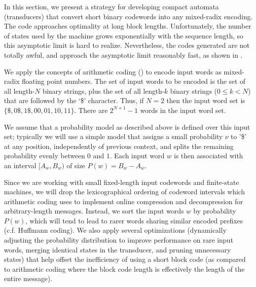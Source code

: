 \documentclass[english]{article}
\begin{document}
In this section, we present a strategy for developing compact automata (transducers) that convert short binary codewords into any mixed-radix encoding.
The code approaches optimality at long block lengths.
Unfortunately, the number of states used by the machine grows exponentially with the sequence length, so this asymptotic limit is hard to realize.
Nevertheless, the codes generated are not totally awful, and approach the asymptotic limit reasonably fast,
as shown in .

We apply the concepts of arithmetic coding () to encode input words as mixed-radix floating point numbers.
The set of input words to be encoded is the set of all length-$N$ binary strings,
plus the set of all length-$k$ binary strings ($0 \leq k < N$) that are followed by the `\$' character.
Thus, if $N=2$ then the input word set is $\{\$,0\$,1\$,00,01,10,11\}$.
There are $2^{N+1}-1$ words in the input word set.

We assume that a probability model as described above is defined over this input set;
typically we will use a simple model that assigns a small probability $\nu$ to '\$' at any position,
independently of previous context,
and splits the remaining probability evenly between $0$ and $1$.
Each input word $w$ is then associated with an interval $[A_w,B_w)$ of size $P(w) = B_w-A_w$.

Since we are working with small fixed-length input codewords and finite-state machines, we will drop the lexicographical ordering of codeword intervals
which arithmetic coding uses to implement online compression and decompression for arbitrary-length messages.
Instead, we sort the input words $w$ by probability $P(w)$, which will tend to lead to rarer words sharing similar encoded prefixes
(c.f. Huffmann coding).
We also apply several optimizations (dynamically adjusting the probability distribution to improve performance on rare input words,
merging identical states in the transducer, and pruning unnecessary states) that help offset the inefficiency of using a short block code
(as compared to arithmetic coding where the block code length is effectively the length of the entire message).
\end{document}
